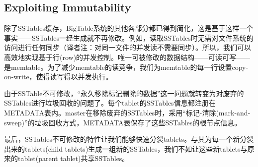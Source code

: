 \documentclass{article}
\begin{document}
\subsection{Exploiting Immutability}
除了SSTables缓存，BigTable系统的其他各部分都已得到简化，这是基于这样一个事实——SSTables一经生成就不再修改。例如，读取SSTables时无需对文件系统的访问进行任何同步（译者注：对同一文件的并发读不需要同步）。所以，我们可以高效地实现基于行(row)的并发控制。唯一可被修改的数据结构——可读可写——是memtable。为了减少memtable的读竞争，我们为memtable的每一行设置copy-on-write，使得读写得以并发执行。\par
由于SSTable不可修改，“永久移除标记删除的数据”这一问题就转变为对废弃的SSTables进行垃圾回收的问题了。每个tablet的SSTables信息都注册在METADATA表内。master在移除废弃的SSTables时，采用“标记-清除(mark-and-sweep)”的垃圾回收方式，METADATA表保存了这些SSTables的根节点信息。\par
最后，SSTables不可修改的特性让我们能够快速分裂tablets。与其为每一个新分裂出来的tablets(child tablets)生成一组新的SSTables，我们不如让这些新tablets与原来的tablet(parent tablet)共享SSTables。
\end{document}
